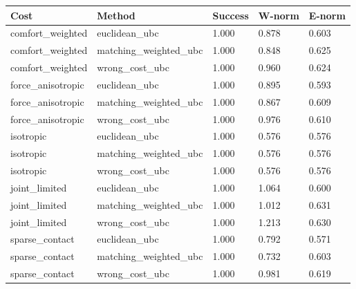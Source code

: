 \begin{tabular}{lllll}
\toprule
Cost & Method & Success & W-norm & E-norm \\
\midrule
comfort\_weighted & euclidean\_ubc & 1.000 & 0.878 & 0.603 \\
comfort\_weighted & matching\_weighted\_ubc & 1.000 & 0.848 & 0.625 \\
comfort\_weighted & wrong\_cost\_ubc & 1.000 & 0.960 & 0.624 \\
force\_anisotropic & euclidean\_ubc & 1.000 & 0.895 & 0.593 \\
force\_anisotropic & matching\_weighted\_ubc & 1.000 & 0.867 & 0.609 \\
force\_anisotropic & wrong\_cost\_ubc & 1.000 & 0.976 & 0.610 \\
isotropic & euclidean\_ubc & 1.000 & 0.576 & 0.576 \\
isotropic & matching\_weighted\_ubc & 1.000 & 0.576 & 0.576 \\
isotropic & wrong\_cost\_ubc & 1.000 & 0.576 & 0.576 \\
joint\_limited & euclidean\_ubc & 1.000 & 1.064 & 0.600 \\
joint\_limited & matching\_weighted\_ubc & 1.000 & 1.012 & 0.631 \\
joint\_limited & wrong\_cost\_ubc & 1.000 & 1.213 & 0.630 \\
sparse\_contact & euclidean\_ubc & 1.000 & 0.792 & 0.571 \\
sparse\_contact & matching\_weighted\_ubc & 1.000 & 0.732 & 0.603 \\
sparse\_contact & wrong\_cost\_ubc & 1.000 & 0.981 & 0.619 \\
\bottomrule
\end{tabular}
